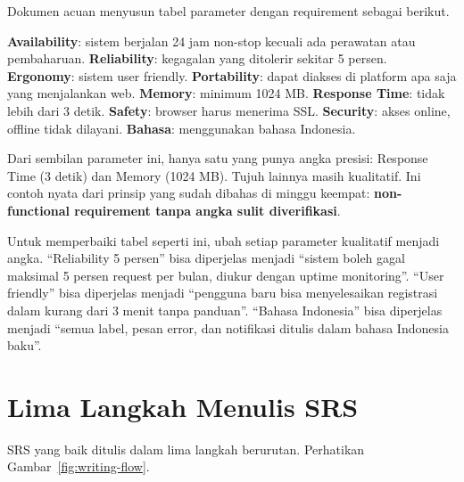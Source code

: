 \documentclass[11pt,a4paper]{article}
\begin{document}
Dokumen acuan menyusun tabel parameter dengan requirement sebagai berikut.

\textbf{Availability}: sistem berjalan 24 jam non-stop kecuali ada perawatan atau pembaharuan. \textbf{Reliability}: kegagalan yang ditolerir sekitar 5 persen. \textbf{Ergonomy}: sistem user friendly. \textbf{Portability}: dapat diakses di platform apa saja yang menjalankan web. \textbf{Memory}: minimum 1024 MB. \textbf{Response Time}: tidak lebih dari 3 detik. \textbf{Safety}: browser harus menerima SSL. \textbf{Security}: akses online, offline tidak dilayani. \textbf{Bahasa}: menggunakan bahasa Indonesia.

Dari sembilan parameter ini, hanya satu yang punya angka presisi: Response Time (3 detik) dan Memory (1024 MB). Tujuh lainnya masih kualitatif. Ini contoh nyata dari prinsip yang sudah dibahas di minggu keempat: \textbf{non-functional requirement tanpa angka sulit diverifikasi}.

Untuk memperbaiki tabel seperti ini, ubah setiap parameter kualitatif menjadi angka. ``Reliability 5 persen'' bisa diperjelas menjadi ``sistem boleh gagal maksimal 5 persen request per bulan, diukur dengan uptime monitoring''. ``User friendly'' bisa diperjelas menjadi ``pengguna baru bisa menyelesaikan registrasi dalam kurang dari 3 menit tanpa panduan''. ``Bahasa Indonesia'' bisa diperjelas menjadi ``semua label, pesan error, dan notifikasi ditulis dalam bahasa Indonesia baku''.

\section{Lima Langkah Menulis SRS}

SRS yang baik ditulis dalam lima langkah berurutan. Perhatikan Gambar~\ref{fig:writing-flow}.
\end{document}
